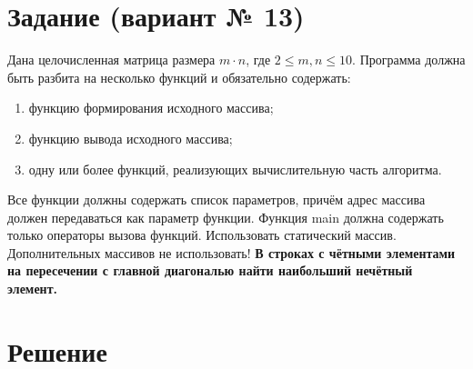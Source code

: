 \documentclass[12pt]{article}
\begin{document}
	\newpage
	
	
	\section*{Задание (вариант № 13)}
	
	 Дана целочисленная матрица размера $m \cdot n$, где $2 \leq m, n \leq 10$.
	 Программа должна быть разбита на несколько функций и обязательно содержать:
	 \begin{enumerate}
	 	\item функцию формирования исходного массива;
	 	\item функцию вывода исходного массива;
	 	\item одну или более функций, реализующих вычислительную часть алгоритма.
	 \end{enumerate}
	 Все функции должны содержать список параметров, причём адрес массива должен передаваться как параметр функции. Функция main должна содержать только операторы вызова функций. Использовать статический массив. Дополнительных массивов не использовать!
	 \vspace{5pt}
	 \newline
	 \textbf{В строках с чётными элементами на пересечении с главной диагональю найти
	 наибольший нечётный элемент.}
	
	\newpage
	
	\section*{Решение}
	
\end{document}
